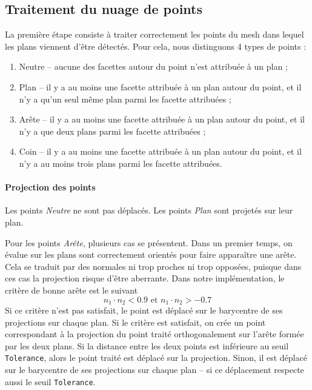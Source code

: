 \documentclass[12pt, twoside]{article}
\begin{document}
\subsection{Traitement du nuage de points}
La première étape consiste à traiter correctement les points du mesh dans lequel les plans viennent d'être détectés. Pour cela, nous distinguons 4 types de points :
\begin{enumerate}
  \item Neutre -- aucune des facettes autour du point n'est attribuée à un plan ;
  \item Plan -- il y a au moins une facette attribuée à un plan autour du point, et il n'y a qu'un seul même plan parmi les facette attribuées ;
  \item Arête -- il y a au moins une facette attribuée à un plan autour du point, et il n'y a que deux plans parmi les facette attribuées ;
  \item Coin -- il y a au moins une facette attribuée à un plan autour du point, et il n'y a au moins trois plans parmi les facette attribuées.
\end{enumerate}

\paragraph{Projection des points} Les points \textit{Neutre} ne sont pas déplacés. Les points \textit{Plan} sont projetés sur leur plan.

Pour les points \textit{Arête}, plusieurs cas se présentent. Dans un premier temps, on évalue sur les plans sont correctement orientés pour faire apparaître une arête. Cela se traduit par des normales ni trop proches ni trop opposées, puisque dans ces cas la projection risque d'être aberrante. Dans notre implémentation, le critère de bonne arête est le suivant
$$n_1\cdot n_2 < 0.9 \text{ et } n_1\cdot n_2 > -0.7$$
Si ce critère n'est pas satisfait, le point est déplacé sur le barycentre de ses projections sur chaque plan. Si le critère est satisfait, on crée un point correspondant à la projection du point traité orthogonalement sur l'arête formée par les deux plans. Si la distance entre les deux points est inférieure au seuil \texttt{Tolerance}, alors le point traité est déplacé sur la projection. Sinon, il est déplacé sur le barycentre de ses projections sur chaque plan -- si ce déplacement respecte aussi le seuil \texttt{Tolerance}.
\end{document}
